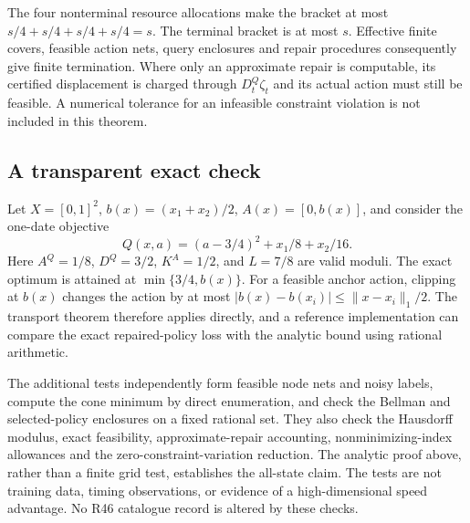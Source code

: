 The four nonterminal resource allocations make the bracket at most $s/4+s/4+s/4+s/4=s$. The terminal bracket is at most $s$. Effective finite covers, feasible action nets, query enclosures and repair procedures consequently give finite termination. Where only an approximate repair is computable, its certified displacement is charged through $D_t^Q\zeta_t$ and its actual action must still be feasible. A numerical tolerance for an infeasible constraint violation is not included in this theorem.

\subsection{A transparent exact check}
Let $X=[0,1]^2$, $b(x)=(x_1+x_2)/2$, $A(x)=[0,b(x)]$, and consider the one-date objective
\[
 Q(x,a)=(a-3/4)^2+x_1/8+x_2/16.
\]
Here $A^Q=1/8$, $D^Q=3/2$, $K^A=1/2$, and $L=7/8$ are valid moduli. The exact optimum is attained at $\min\{3/4,b(x)\}$. For a feasible anchor action, clipping at $b(x)$ changes the action by at most $|b(x)-b(x_i)|\le\|x-x_i\|_1/2$. The transport theorem therefore applies directly, and a reference implementation can compare the exact repaired-policy loss with the analytic bound using rational arithmetic.

The additional tests independently form feasible node nets and noisy labels, compute the cone minimum by direct enumeration, and check the Bellman and selected-policy enclosures on a fixed rational set. They also check the Hausdorff modulus, exact feasibility, approximate-repair accounting, nonminimizing-index allowances and the zero-constraint-variation reduction. The analytic proof above, rather than a finite grid test, establishes the all-state claim. The tests are not training data, timing observations, or evidence of a high-dimensional speed advantage. No R46 catalogue record is altered by these checks.
